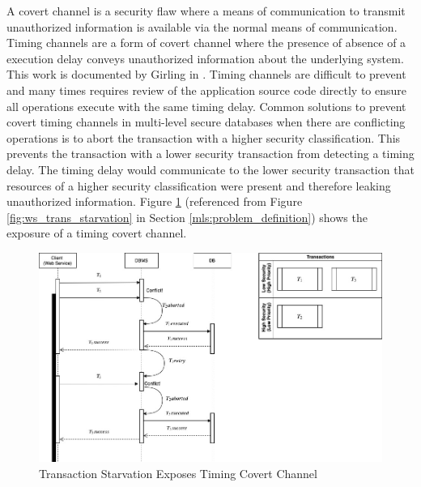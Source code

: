 A covert channel is a security flaw where a means of communication to transmit unauthorized information is available via the normal means of communication. Timing channels are a form of covert channel where the presence of absence of a execution delay conveys unauthorized information about the underlying system. This work is documented by Girling in \cite{girling_covert_1987}. Timing channels are difficult to prevent and many times requires review of the application source code directly to ensure all operations execute with the same timing delay. Common solutions to prevent covert timing channels in multi-level secure databases when there are conflicting operations is to abort the transaction with a higher security classification. This prevents the transaction with a lower security transaction from detecting a timing delay. The timing delay would communicate to the lower security transaction that resources of a higher security classification were present and therefore leaking unauthorized information. Figure \ref{fig:env_covert_channel_exposure} (referenced from Figure \ref{fig:ws_trans_starvation} in Section \ref{mls:problem_definition}) shows the exposure of a timing covert channel.

\begin{figure}
\centering
\includegraphics[scale=0.45]{images/TransactionStarvation.jpg}
\caption{Transaction Starvation Exposes Timing Covert Channel}
\label{fig:env_covert_channel_exposure}
\end{figure}